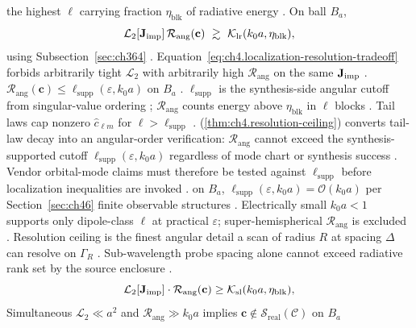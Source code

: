 the highest \(\ell\) carrying fraction \(\eta_{\mathrm{blk}}\) of radiative energy \cite{hansen1988}. On ball \(B_{a}\),
\begin{equation}
\label{eq:ch4.localization-resolution-tradeoff}
\mathcal{L}_{2}[\Jimp]\,\mathcal{R}_{\mathrm{ang}}(\mathbf{c})\ \gtrsim\ \mathcal{K}_{\mathrm{lr}}(k_{0}a,\eta_{\mathrm{blk}}),
\end{equation}
using Subsection~\ref{sec:ch364} \cite{jackson1999}. Equation~\eqref{eq:ch4.localization-resolution-tradeoff} forbids
arbitrarily tight \(\mathcal{L}_{2}\) with arbitrarily high \(\mathcal{R}_{\mathrm{ang}}\) on the same \(\mathbf{J}_{\mathrm{imp}}\) \cite{stratton1941}.
\label{thm:ch4.resolution-ceiling}
\(\mathcal{R}_{\mathrm{ang}}(\mathbf{c})\le\ell_{\mathrm{supp}}(\varepsilon,k_{0}a)\) on \(B_{a}\) \cite{hansen1988}.
\(\ell_{\mathrm{supp}}\) is the synthesis-side angular cutoff from singular-value ordering \cite{harrington2001}; \(\mathcal{R}_{\mathrm{ang}}\) counts
energy above \(\eta_{\mathrm{blk}}\) in \(\ell\) blocks \cite{hansen1988}. Tail laws cap nonzero \(\widehat{c}_{\ell m}\) for
\(\ell>\ell_{\mathrm{supp}}\) \cite{devaney2004}.
(\ref{thm:ch4.resolution-ceiling}) converts tail-law decay into an angular-order verification: \(\mathcal{R}_{\mathrm{ang}}\) cannot exceed the
synthesis-supported cutoff \(\ell_{\mathrm{supp}}(\varepsilon,k_{0}a)\) regardless of mode chart or synthesis success \cite{hansen1988}.
Vendor orbital-mode claims must therefore be tested against \(\ell_{\mathrm{supp}}\) before localization inequalities are invoked \cite{devaney2004}.
on \(B_{a}\), \(\ell_{\mathrm{supp}}(\varepsilon,k_{0}a)=\mathcal{O}(k_{0}a)\) per Section~\ref{sec:ch46} finite observable structures \cite{hansen1988}.
Electrically small \(k_{0}a<1\) supports only dipole-class \(\ell\) at practical \(\varepsilon\); super-hemispherical \(\mathcal{R}_{\mathrm{ang}}\) is excluded
\cite{jackson1999}.
Resolution ceiling is the finest angular detail a scan of radius $R$ at spacing $\Delta$ can resolve on $\Gamma_R$ \cite{harrington2001}. Sub-wavelength probe spacing alone cannot exceed radiative rank set by the source enclosure \cite{hansen1988}.
\begin{equation}
\label{eq:ch4.simultaneous-loc-ell}
\mathcal{L}_{2}[\mathbf{J}_{\mathrm{imp}}]\cdot\mathcal{R}_{\mathrm{ang}}(\mathbf{c})\ge\mathcal{K}_{\mathrm{sl}}(k_{0}a,\eta_{\mathrm{blk}}),
\end{equation}
\label{cor:ch4.super-resolution-obstruction}
Simultaneous \(\mathcal{L}_{2}\ll a^{2}\) and \(\mathcal{R}_{\mathrm{ang}}\gg k_{0}a\) implies \(\mathbf{c}\notin\mathcal{S}_{\mathrm{real}}(\mathcal{C})\) on \(B_{a}\)
